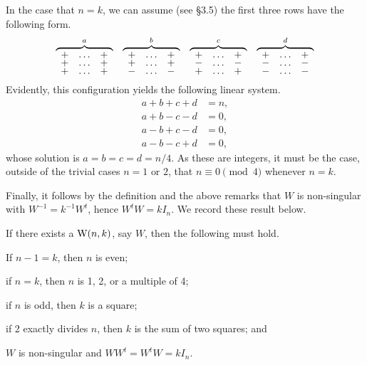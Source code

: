 \documentclass[../../../main]{subfiles}
\begin{document}
 In the case that $n = k$, we can assume (see \S3.5) the first three rows have the following form.
 \[
 \def\arraystretch{0.65}
  \begin{array}{cccc}
   \overbrace{
   \begin{array}{ccc}
   + & \dots & + \\ + & \dots & + \\ + & \dots & +
   \end{array}
   }^a
   &
   \overbrace{
   \begin{array}{ccc}
   + & \dots & + \\ + & \dots & + \\ - & \dots & -
   \end{array}
   }^b
   &
   \overbrace{
   \begin{array}{ccc}
   + & \dots & + \\ - & \dots & - \\ + & \dots & +
   \end{array}
   }^c
   &
   \overbrace{
   \begin{array}{ccc}
   + & \dots & + \\ - & \dots & - \\ - & \dots & -
   \end{array}
   }^d
  \end{array}
 \]
 Evidently, this configuration yields the following linear system.
 \begin{align*}
  a + b + c + d &= n, \\
  a + b - c - d &= 0, \\
  a - b + c - d &= 0, \\
  a - b - c + d &= 0,
 \end{align*}
 whose solution is $a = b = c = d = n/4$. As these are integers, it must be the case, outside of the trivial cases $n = 1 \text{ or } 2$, that $n \equiv 0 \pmod{4}$ whenever $n = k$.
 
 Finally, it follows by the definition and the above remarks that $W$ is non-singular with $W^{-1} = k^{-1}W^t$, hence $W^tW = kI_n$. We record these result below.
 
 \begin{prop}\label{weighing properties}
  If there exists a $\text{W}(n,k)$, say $W$, then the following must hold.
  \begin{defenum}
   \item If $n-1 = k$, then $n$ is even;
   
   \item if $n = k$, then $n$ is 1, 2, or a multiple of 4;
   
   \item if $n$ is odd, then $k$ is a square; 
   
   \item if 2 exactly divides $n$, then $k$ is the sum of two squares; and
   
   \item $W$ is non-singular and $WW^t = W^tW = kI_n$.
  \end{defenum}
 \end{prop}
 
\end{document}

